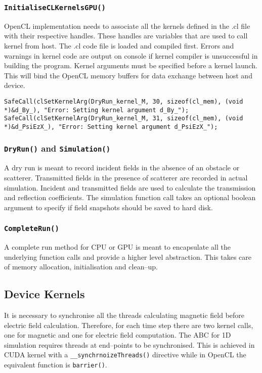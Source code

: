 \subsubsection{\texttt{InitialiseCLKernelsGPU()}}
OpenCL implementation needs to associate all the kernels defined in the .cl file with their respective handles. These handles are variables that are used to call kernel from host. The .cl code file is loaded and compiled first. Errors and warnings in kernel code are output on console if kernel compiler is unsuccessful in building the program. Kernel arguments must be specified before a kernel launch. This will bind the OpenCL memory buffers for data exchange between host and device.
\label{lst:OpenCL-Setting-Kernel-Arguments}
\begin{lstlisting}[caption={Setting kernel arguments in OpenCL}]
SafeCall(clSetKernelArg(DryRun_kernel_M, 30, sizeof(cl_mem), (void *)&d_By_), "Error: Setting kernel argument d_By_");
SafeCall(clSetKernelArg(DryRun_kernel_M, 31, sizeof(cl_mem), (void *)&d_PsiEzX_), "Error: Setting kernel argument d_PsiEzX_");
\end{lstlisting}
\subsubsection{\texttt{DryRun()} and \texttt{Simulation()}}
A dry run is meant to record incident fields in the absence of an obstacle or scatterer. Transmitted fields in the presence of scatterer are recorded in actual simulation. Incident and transmitted fields are used to calculate the transmission and reflection coefficients. The simulation function call takes an optional boolean argument to specify if field snapshots should be saved to hard disk.
\subsubsection{\texttt{CompleteRun()}}
A complete run method for CPU or GPU is meant to encapsulate all the underlying function calls and provide a higher level abstraction. This takes care of memory allocation, initialisation and clean--up.
\subsection{Device Kernels}
It is necessary to synchronise all the threads calculating magnetic field before electric field calculation. Therefore, for each time step there are two kernel calls, one for magnetic and one for electric field computation. The ABC for 1D simulation requires threads at end--points to be synchronised. This is achieved in CUDA kernel with a \verb|__synchrnoizeThreads()| directive while in OpenCL the equivalent function is \verb|barrier()|.

